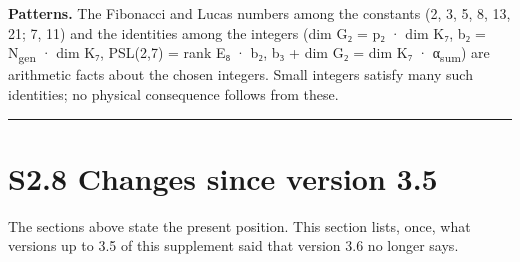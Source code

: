 \documentclass[11pt,a4paper]{article}
\begin{document}
\textbf{Patterns.} The Fibonacci and Lucas numbers among the constants (2, 3, 5, 8, 13, 21; 7, 11) and the identities among the integers (dim G₂ = p₂ · dim K₇, b₂ = N\textsubscript{gen} · dim K₇, \textbar PSL(2,7)\textbar{} = rank E₈ · b₂, b₃ + dim G₂ = dim K₇ · α\textsubscript{sum}) are arithmetic facts about the chosen integers. Small integers satisfy many such identities; no physical consequence follows from these.

\begin{center}\rule{\linewidth}{0.5pt}\end{center}

\section{S2.8 Changes since version 3.5}\label{s2.8-changes-since-version-3.5}

The sections above state the present position. This section lists, once, what versions up to 3.5 of this supplement said that version 3.6 no longer says.
\end{document}
